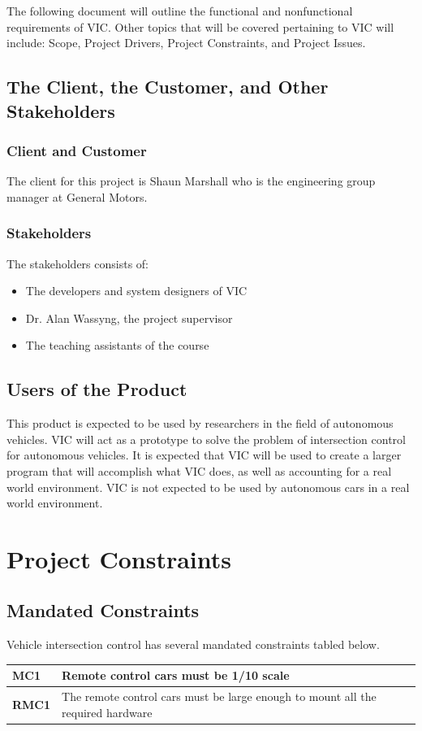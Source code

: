 \documentclass [11pt]{article}
\begin{document}
The following document will outline the functional and nonfunctional requirements of VIC.  Other topics that will be covered pertaining to VIC will include: Scope, Project Drivers, Project Constraints, and Project Issues.

\subsection{The Client, the Customer, and Other Stakeholders}

\subsubsection{Client and Customer}
	The client for this project is Shaun Marshall who is the engineering group manager at General Motors. 


\subsubsection{Stakeholders}
 
 	The stakeholders consists of:
 		\begin{itemize}

 		\item The developers and system designers of VIC
 		\item Dr. Alan Wassyng, the project supervisor
 		\item The teaching assistants of the course
 		\end{itemize} 

\subsection{Users of the Product} 

This product is expected to be used by researchers in the field of autonomous vehicles.  VIC will act as a prototype to solve the problem of intersection control for autonomous vehicles.  It is expected that VIC will be used to create a larger program that will accomplish what VIC does, as well as accounting for a real world environment.  VIC is not expected to be used by autonomous cars in a real world environment. 

\section{\textbf{Project Constraints}}


\subsection{Mandated Constraints}
Vehicle intersection control has several mandated constraints tabled below. 
\begin{longtable}{| p{ } | p{ } | }\hline 
\textbf{MC1} & \textbf{Remote control cars must be 1/10 scale} \\ \hline
\textbf{RMC1} & The remote control cars must be large enough to mount all the required hardware\\ \hline 

\end{longtable}
\end{document}
